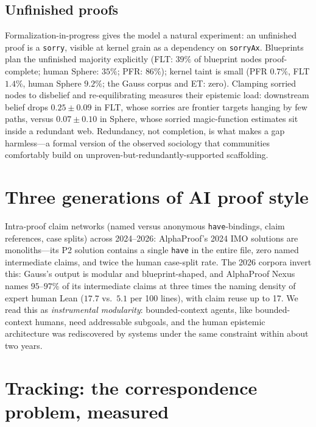 \documentclass[11pt]{article}
\begin{document}
\subsection{Unfinished proofs}
\label{sec:sorry}

Formalization-in-progress gives the model a natural experiment: an unfinished proof is a
\texttt{sorry}, visible at kernel grain as a dependency on \texttt{sorryAx}. Blueprints plan the
unfinished majority explicitly (FLT: $39\%$ of blueprint nodes proof-complete; human Sphere:
$35\%$; PFR: $86\%$); kernel taint is small (PFR $0.7\%$, FLT $1.4\%$, human Sphere $9.2\%$;
the Gauss corpus and ET: zero). Clamping sorried nodes to disbelief and re-equilibrating
measures their epistemic load: downstream belief drops $0.25 \pm 0.09$ in FLT, whose sorries
are frontier targets hanging by few paths, versus $0.07 \pm 0.10$ in Sphere, whose sorried
magic-function estimates sit inside a redundant web. Redundancy, not completion, is what makes
a gap harmless---a formal version of the observed sociology that communities comfortably build
on unproven-but-redundantly-supported scaffolding.

\section{Three generations of AI proof style}
\label{sec:style}

Intra-proof claim networks (named versus anonymous \texttt{have}-bindings, claim references,
case splits) across 2024--2026: AlphaProof's 2024 IMO solutions are monoliths---its P2 solution
contains a single \texttt{have} in the entire file, zero named intermediate claims, and twice
the human case-split rate. The 2026 corpora invert this: Gauss's output is modular and
blueprint-shaped, and AlphaProof Nexus names $95$--$97\%$ of its intermediate claims at three
times the naming density of expert human Lean ($17.7$ vs.\ $5.1$ per 100 lines), with claim
reuse up to 17. We read this as \emph{instrumental modularity}: bounded-context agents, like
bounded-context humans, need addressable subgoals, and the human epistemic architecture was
rediscovered by systems under the same constraint within about two years.

\section{Tracking: the correspondence problem, measured}
\label{sec:tracking}
\end{document}
